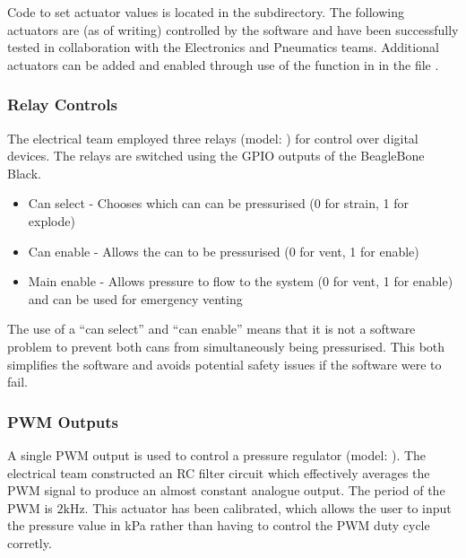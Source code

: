 Code to set actuator values is located in the  subdirectory. The following actuators are (as of writing) controlled by the software and have been successfully tested in collaboration with the Electronics and Pneumatics teams. Additional actuators can be added and enabled through use of the  function in  in the file .

\subsubsection{Relay Controls}

The electrical team employed three relays (model: ) for control over digital devices. The relays are switched using the GPIO outputs of the BeagleBone Black.

\begin{itemize}
	\item Can select - Chooses which can can be pressurised (0 for strain, 1 for explode)
	\item Can enable - Allows the can to be pressurised (0 for vent, 1 for enable)
	\item Main enable - Allows pressure to flow to the system (0 for vent, 1 for enable) and can be used for emergency venting
\end{itemize}

The use of a ``can select'' and ``can enable'' means that it is not a software problem to prevent both cans from simultaneously being pressurised. This both simplifies the software and avoids potential safety issues if the software were to fail.


\subsubsection{PWM Outputs}

A single PWM output is used to control a pressure regulator (model: ). The electrical team constructed an RC filter circuit which effectively averages the PWM signal to produce an almost constant analogue output. The period of the PWM is $2\text{kHz}$. This actuator has been calibrated, which allows the user to input the pressure value in kPa rather than having to control the PWM duty cycle corretly.


